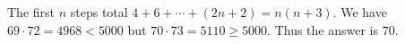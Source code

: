 The first $n$ steps total $4+6+\cdots+(2n+2)=n(n+3)$. We have $69\cdot72=4968<5000$ but $70\cdot73=5110\ge5000$. Thus the answer is $\boxed{70}$.
